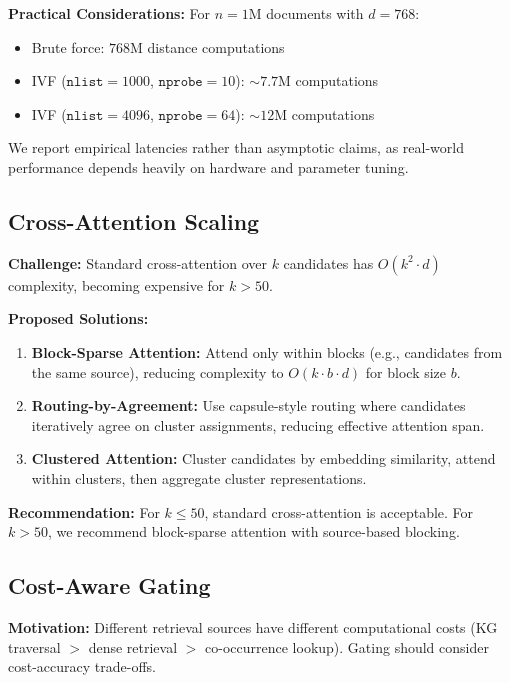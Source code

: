\documentclass[11pt,a4paper]{article}
\begin{document}
\textbf{Practical Considerations:} For $n = 1$M documents with $d = 768$:
\begin{itemize}
    \item Brute force: $768$M distance computations
    \item IVF ($\texttt{nlist}=1000$, $\texttt{nprobe}=10$): $\sim 7.7$M computations
    \item IVF ($\texttt{nlist}=4096$, $\texttt{nprobe}=64$): $\sim 12$M computations
\end{itemize}

We report empirical latencies rather than asymptotic claims, as real-world performance depends heavily on hardware and parameter tuning.

\subsection{Cross-Attention Scaling}
\label{sec:cross_attention_scaling}

\textbf{Challenge:} Standard cross-attention over $k$ candidates has $O(k^2 \cdot d)$ complexity, becoming expensive for $k > 50$.

\textbf{Proposed Solutions:}
\begin{enumerate}
    \item \textbf{Block-Sparse Attention:} Attend only within blocks (e.g., candidates from the same source), reducing complexity to $O(k \cdot b \cdot d)$ for block size $b$.
    
    \item \textbf{Routing-by-Agreement:} Use capsule-style routing \citep{sabour2017dynamic} where candidates iteratively agree on cluster assignments, reducing effective attention span.
    
    \item \textbf{Clustered Attention:} Cluster candidates by embedding similarity, attend within clusters, then aggregate cluster representations.
\end{enumerate}

\textbf{Recommendation:} For $k \leq 50$, standard cross-attention is acceptable. For $k > 50$, we recommend block-sparse attention with source-based blocking.

\subsection{Cost-Aware Gating}
\label{sec:cost_aware}

\textbf{Motivation:} Different retrieval sources have different computational costs (KG traversal $>$ dense retrieval $>$ co-occurrence lookup). Gating should consider cost-accuracy trade-offs.
\end{document}
